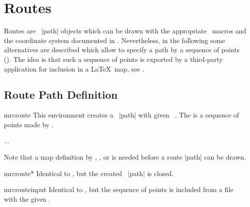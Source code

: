\clearpage
\section{Routes}\label{sec:routes}%

Routes are \tikzname\ |path| objects which can be drawn with the appropriate
\tikzname\ macros and the coordinate system documented in
.
Nevertheless, in the following some alternatives are described which allow
to specify a path by a sequence of points ().
The idea is that such a sequence of points is exported by a third-party
application for inclusion in a \LaTeX\ map, see .


\subsection{Route Path Definition}

\begin{docEnvironment}{mrcroute}{}
  This environment creates a \tikzname\ |path| with given \tikzname\ .
  The  is a sequence of points made by .
  \begin{dispListing}
  \begin{mrcroute}
     ...
  \end{mrcroute}
  \end{dispListing}
  Note that a map definition by , ,
  or  is needed before a route |path| can be drawn.\par
\end{docEnvironment}


\begin{docEnvironment}{mrcroute*}{}
  Identical to , but the created \tikzname\ |path| is
  closed.
\end{docEnvironment}


\begin{docCommand}{mrcrouteinput}{}
  Identical to , but the sequence of points is included
  from a file with the given .
\end{docCommand}

